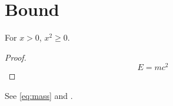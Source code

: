 \section{Bound}
\begin{theorem}\label{thm:alpha} For $x>0$, $x^2\geq0$.\end{theorem}
\begin{proof}\begin{equation}\label{eq:mass} E=mc^2\end{equation}\end{proof}
See \eqref{eq:mass} and \cite{Einstein1905}.